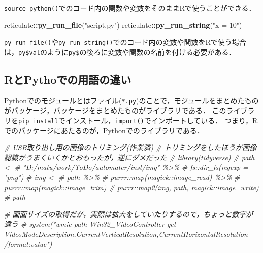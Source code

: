 \documentclass[
]{article}
\newenvironment{Shaded}{\begin{snugshade}}{\end{snugshade}}
\newcommand{\CommentTok}[1]{\textcolor[rgb]{0.56,0.35,0.01}{\textit{#1}}}
\newcommand{\FunctionTok}[1]{\textcolor[rgb]{0.13,0.29,0.53}{\textbf{#1}}}
\newcommand{\NormalTok}[1]{#1}
\newcommand{\SpecialCharTok}[1]{\textcolor[rgb]{0.81,0.36,0.00}{\textbf{#1}}}
\newcommand{\StringTok}[1]{\textcolor[rgb]{0.31,0.60,0.02}{#1}}
\begin{document}
\texttt{source\_python()}でのコード内の関数や変数をそのままRで使うことができる．

\begin{Shaded}
\begin{Highlighting}[]
\NormalTok{reticulate}\SpecialCharTok{::}\FunctionTok{py\_run\_file}\NormalTok{(}\StringTok{"script.py"}\NormalTok{)}
\NormalTok{reticulate}\SpecialCharTok{::}\FunctionTok{py\_run\_string}\NormalTok{(}\StringTok{"x = 10"}\NormalTok{)}
\end{Highlighting}
\end{Shaded}

\texttt{py\_run\_file()}や\texttt{py\_run\_string()}でのコード内の変数や関数をRで使う場合は，\texttt{py\$val}のように\texttt{py\$}の後ろに変数や関数の名前を付ける必要がある．

\hypertarget{rux3068pythoux3067ux306eux7528ux8a9eux306eux9055ux3044}{%
\subsection{RとPythoでの用語の違い}\label{rux3068pythoux3067ux306eux7528ux8a9eux306eux9055ux3044}}

Pythonでのモジュールとはファイル(\texttt{*.py})のことで，モジュールをまとめたものがパッケージ，パッケージをまとめたものがライブラリである．
このライブラリを\texttt{pip\ install}でインストール，\texttt{import()}でインポートしている．
つまり，Rでのパッケージにあたるのが，Pythonでのライブラリである．

\begin{Shaded}
\begin{Highlighting}[]
  \CommentTok{\# USB取り出し用の画像のトリミング(作業済)}
  \CommentTok{\#   トリミングをしたほうが画像認識がうまくいくかとおもったが，逆にダメだった}
  \CommentTok{\# library(tidyverse)}
  \CommentTok{\# path \textless{}{-} }
  \CommentTok{\#   "D:/matu/work/ToDo/automater/inst/img" \%\textgreater{}\%}
  \CommentTok{\#   fs::dir\_ls(regexp = "png") }
  \CommentTok{\# img \textless{}{-} }
  \CommentTok{\#   path \%\textgreater{}\%}
  \CommentTok{\#   purrr::map(magick::image\_read) \%\textgreater{}\%}
  \CommentTok{\#   purrr::map(magick::image\_trim)}
  \CommentTok{\# purrr::map2(img, path, magick::image\_write)}
  \CommentTok{\# path}
\end{Highlighting}
\end{Shaded}

\begin{Shaded}
\begin{Highlighting}[]
  \CommentTok{\# 画面サイズの取得だが，実際は拡大をしていたりするので，ちょっと数字が違う}
  \CommentTok{\# system("wmic path Win32\_VideoController get VideoModeDescription,CurrentVerticalResolution,CurrentHorizontalResolution /format:value")}
\end{Highlighting}
\end{Shaded}
\end{document}
